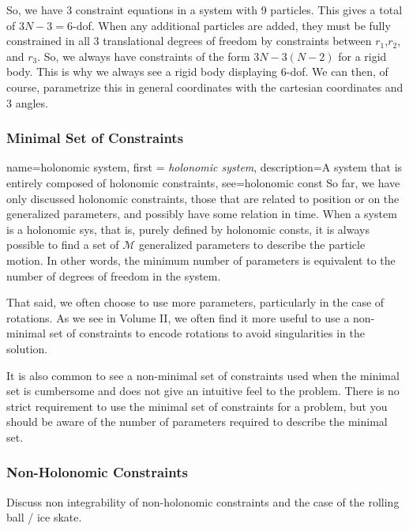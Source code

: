 So, we have 3 constraint equations in a system with 9 particles. This gives a total of $3N-3=6$-\gls{dof}. When any additional particles are added, they must be fully constrained in all 3 translational degrees of freedom by constraints between $r_1$,$r_2$, and $r_3$. So, we always have constraints of the form $3N-3(N-2)$ for a \gls{rigid body}. This is why we always see a \gls{rigid body} displaying 6-\gls{dof}. We can then, of course, parametrize this in general coordinates with the cartesian coordinates and 3 angles.

\subsubsection{Minimal Set of Constraints}

{
    name=holonomic system,
    first = {\textit{holonomic system}},
    description={A system that is entirely composed of holonomic constraints},
    see={holonomic const}
}
So far, we have only discussed holonomic constraints, those that are related to position or on the generalized parameters, and possibly have some relation in time. When a system is a \gls{holonomic sys}, that is, purely defined by \glspl{holonomic const}, it is always possible to find a set of $\mathcal{M}$ generalized parameters to describe the particle motion. In other words, the minimum number of parameters is equivalent to the number of degrees of freedom in the system.

That said, we often choose to use more parameters, particularly in the case of rotations. As we see in Volume II, we often find it more useful to use a non-minimal set of constraints to encode rotations to avoid singularities in the solution.

It is also common to see a non-minimal set of constraints used when the minimal set is cumbersome and does not give an intuitive feel to the problem. There is no strict requirement to use the minimal set of constraints for a problem, but you should be aware of the number of parameters required to describe the minimal set.
\subsubsection{Non-Holonomic Constraints}

\color{red} Discuss non integrability of non-holonomic constraints and the case of the rolling ball / ice skate.

\color{black}

